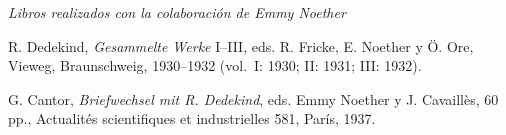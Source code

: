 \clearpage
\begin{center}\emph{Libros realizados con la colaboración de Emmy Noether}\end{center}
\label{buecher-entstanden-unter-mitwirkung-von-emmy-noether}
\begingroup\setlength{\parindent}{0pt}\setlength{\parskip}{0.5em}
R. Dedekind, \emph{Gesammelte Werke} I--III, eds. R. Fricke, E. Noether y Ö. Ore, Vieweg, Braunschweig, 1930--1932 (vol.~I: 1930; II: 1931; III: 1932).\par
G. Cantor, \emph{Briefwechsel mit R. Dedekind}, eds. Emmy Noether y J. Cavaillès, 60 pp., Actualités scientifiques et industrielles 581, París, 1937.\par
\endgroup
